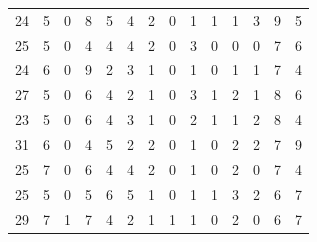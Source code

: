 \begin{table}[]
\begin{tabular}{rrrrrrrrrrrrrr}
		24 & 5 & 0 & 8 & 5 & 4 & 2 & 0 & 1 & 1 & 1 & 3 & 9 & 5 \\
		25 & 5 & 0 & 4 & 4 & 4 & 2 & 0 & 3 & 0 & 0 & 0 & 7 & 6 \\
		24 & 6 & 0 & 9 & 2 & 3 & 1 & 0 & 1 & 0 & 1 & 1 & 7 & 4 \\
		27 & 5 & 0 & 6 & 4 & 2 & 1 & 0 & 3 & 1 & 2 & 1 & 8 & 6 \\
		23 & 5 & 0 & 6 & 4 & 3 & 1 & 0 & 2 & 1 & 1 & 2 & 8 & 4 \\
		31 & 6 & 0 & 4 & 5 & 2 & 2 & 0 & 1 & 0 & 2 & 2 & 7 & 9 \\
		25 & 7 & 0 & 6 & 4 & 4 & 2 & 0 & 1 & 0 & 2 & 0 & 7 & 4 \\
		25 & 5 & 0 & 5 & 6 & 5 & 1 & 0 & 1 & 1 & 3 & 2 & 6 & 7 \\
		29 & 7 & 1 & 7 & 4 & 2 & 1 & 1 & 1 & 0 & 2 & 0 & 6 & 7
	\end{tabular}
\end{table}

